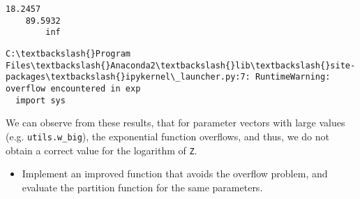 \documentclass[11pt]{article}
\providecommand{\tightlist}{%
      \setlength{\itemsep}{0pt}\setlength{\parskip}{0pt}}
\begin{document}
    \begin{Verbatim}[commandchars=\\\{\}]
    18.2457
    89.5932
        inf

    \end{Verbatim}

    \begin{Verbatim}[commandchars=\\\{\}]
C:\textbackslash{}Program Files\textbackslash{}Anaconda2\textbackslash{}lib\textbackslash{}site-packages\textbackslash{}ipykernel\_launcher.py:7: RuntimeWarning: overflow encountered in exp
  import sys

    \end{Verbatim}

    We can observe from these results, that for parameter vectors with large
values (e.g. \texttt{utils.w\_big}), the exponential function overflows,
and thus, we do not obtain a correct value for the logarithm of
\texttt{Z}.

\begin{itemize}
\tightlist
\item
  Implement an improved function that avoids the overflow problem, and
  evaluate the partition function for the same parameters.
\end{itemize}
\end{document}
